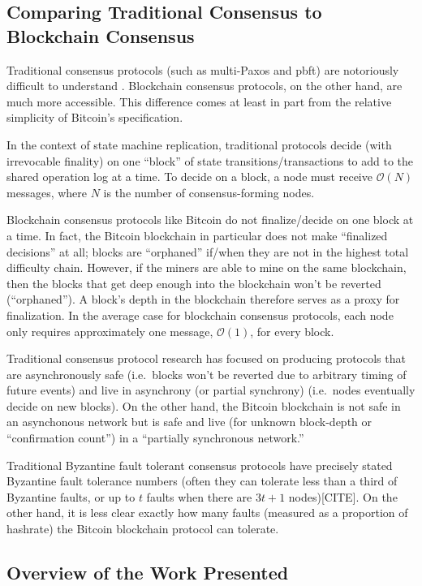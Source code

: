 \documentclass{article}
\theoremstyle{definition}
\begin{document}
\subsection{Comparing Traditional Consensus to Blockchain Consensus}

Traditional consensus protocols (such as multi-Paxos and pbft) are notoriously difficult to understand \cite{paxos}. Blockchain consensus protocols, on the other hand, are much more accessible. This difference comes at least in part from the relative simplicity of Bitcoin's specification.

In the context of state machine replication, traditional protocols decide (with irrevocable finality) on one ``block'' of state transitions/transactions to add to the shared operation log at a time. To decide on a block, a node must receive $\mathcal{O}(N)$ messages, where $N$ is the number of consensus-forming nodes.

Blockchain consensus protocols like Bitcoin do not finalize/decide on one block at a time. In fact, the Bitcoin blockchain in particular does not make ``finalized decisions'' at all; blocks are ``orphaned'' if/when they are not in the highest total difficulty chain. However, if the miners are able to mine on the same blockchain, then the blocks that get deep enough into the blockchain won't be reverted (``orphaned''). A block's depth in the blockchain therefore serves as a proxy for finalization. In the average case for blockchain consensus protocols, each node only requires approximately one message, $\mathcal{O}(1)$, for every block.

Traditional consensus protocol research has focused on producing protocols that are asynchronously safe (i.e.\ blocks won't be reverted due to arbitrary timing of future events) and live in asynchrony (or partial synchrony) (i.e.\ nodes eventually decide on new blocks). On the other hand, the Bitcoin blockchain is not safe in an asynchonous network but is safe and live (for unknown block-depth or ``confirmation count'') in a ``partially synchronous network.''

Traditional Byzantine fault tolerant consensus protocols have precisely stated Byzantine fault tolerance numbers (often they can tolerate less than a third of Byzantine faults, or up to $t$ faults when there are $3t + 1$ nodes)[CITE]. On the other hand, it is less clear exactly how many faults (measured as a proportion of hashrate) the Bitcoin blockchain protocol can tolerate.

\subsection{Overview of the Work Presented}
\end{document}
